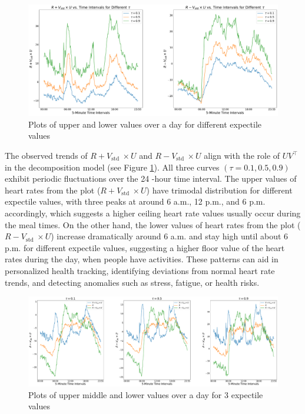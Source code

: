 \documentclass{article}
\begin{document}
\begin{figure}[H]
\centering
\includegraphics[width=1\textwidth]{R+-V_U.pdf} 
\caption{Plots of upper and lower values over a day for different expectile values} 
\label{R+-V_U} 
\end{figure}

The observed trends of $R+V_{\text {std }} \times U$ and $R-V_{\text {std }} \times U$ align with the role of $U V^{\top}$ in the decomposition model (see Figure \ref{R+-V_U}). All three curves $(\tau=0.1,0.5,0.9)$ exhibit periodic fluctuations over the 24 -hour time interval. The upper values of heart rates from the plot ($R+V_{\text {std }} \times U$) have trimodal distribution for different expectile values, with three peaks at around 6 a.m., 12 p.m., and 6 p.m. accordingly, which suggests a higher ceiling heart rate values usually occur during the meal times. On the other hand, the lower values of heart rates from the plot ($R-V_{\text {std }} \times U$) increase dramatically around 6 a.m. and stay high until about 6 p.m. for different expectile values, suggesting a higher floor value of the heart rates during the day, when people have activities. These patterns can aid in personalized health tracking, identifying deviations from normal heart rate trends, and detecting anomalies such as stress, fatigue, or health risks.

\begin{figure}[H]
\centering
\includegraphics[width=1\textwidth]{combined_three_tau_figures.pdf} 
\caption{Plots of upper middle and lower values over a day for 3 expectile values} 
\label{R+-V_U for 3 tau} 
\end{figure}
\end{document}
